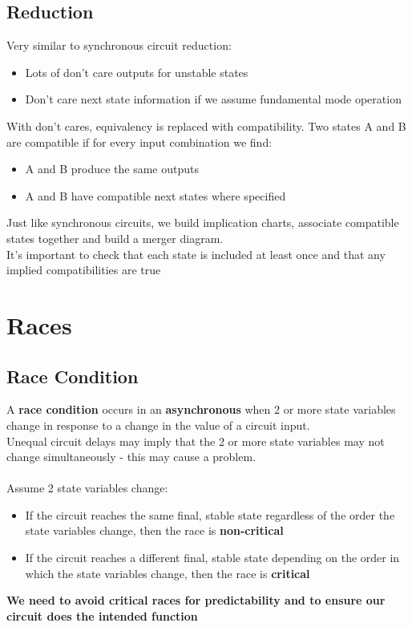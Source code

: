 \documentclass[12pt]{report}
\begin{document}
		\subsection{Reduction}
			Very similar to synchronous circuit reduction:\\
			\begin{itemize}
				\item Lots of don't care outputs for unstable states
				\item Don't care next state information if we assume fundamental mode operation
			\end{itemize}
			With don't cares, equivalency is replaced with compatibility. Two states A and B are compatible if for every input combination we find:
			\begin{itemize}
				\item A and B produce the same outputs
				\item A and B have compatible next states where specified
			\end{itemize}
			Just like synchronous circuits, we build implication charts, associate compatible states together and build a merger diagram.\\
			It's important to check that each state is included at least once and that any implied compatibilities are true
	\section{Races}
		\subsection{Race Condition}
			A \textbf{race condition} occurs in an \textbf{asynchronous} when 2 or more state variables change in response to a change in the value of a circuit input.\\
			Unequal circuit delays may imply that the 2 or more state variables may not change simultaneously - this may cause a problem.\\
			\\
			Assume 2 state variables change:
			\begin{itemize}
				\item If the circuit reaches the same final, stable state regardless of the order the state variables change, then the race is \textbf{non-critical}
				\item If the circuit reaches a different final, stable state depending on the order in which the state variables change, then the race is \textbf{critical}
			\end{itemize}	
			\textbf{We need to avoid critical races for predictability and to ensure our circuit does the intended function}
\end{document}
